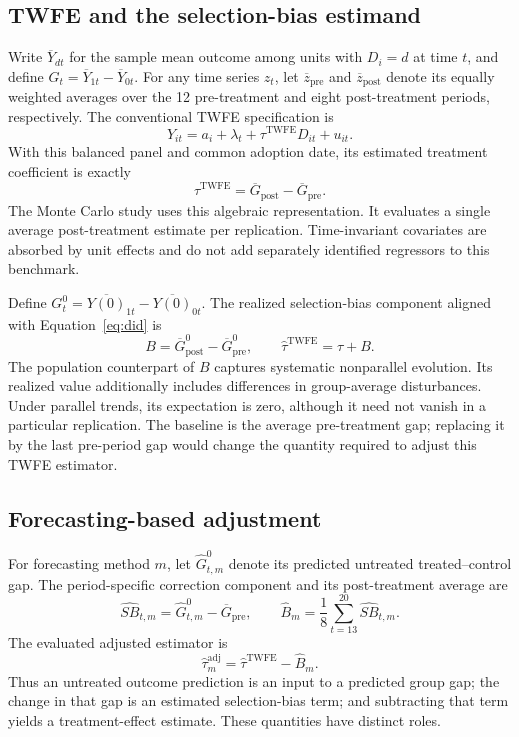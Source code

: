 \documentclass[11pt,a4paper]{article}
\begin{document}
\subsection{TWFE and the selection-bias estimand}
Write $\overline{Y}_{dt}$ for the sample mean outcome among units with $D_i=d$ at time $t$, and define $G_t=\overline{Y}_{1t}-\overline{Y}_{0t}$. For any time series $z_t$, let $\overline z_{\mathrm{pre}}$ and $\overline z_{\mathrm{post}}$ denote its equally weighted averages over the 12 pre-treatment and eight post-treatment periods, respectively. The conventional TWFE specification is
\begin{equation}\label{eq:twfe}
Y_{it}=a_i+\lambda_t+\tau^{\mathrm{TWFE}}D_{it}+u_{it}.
\end{equation}
With this balanced panel and common adoption date, its estimated treatment coefficient is exactly
\begin{equation}\label{eq:did}
\widehat\tau^{\mathrm{TWFE}}=\overline G_{\mathrm{post}}-\overline G_{\mathrm{pre}}.
\end{equation}
The Monte Carlo study uses this algebraic representation. It evaluates a single average post-treatment estimate per replication. Time-invariant covariates are absorbed by unit effects and do not add separately identified regressors to this benchmark.

Define $G_t^0=\overline{Y(0)}_{1t}-\overline{Y(0)}_{0t}$. The realized selection-bias component aligned with Equation~\ref{eq:did} is
\begin{equation}\label{eq:truebias}
B=\overline G^0_{\mathrm{post}}-\overline G^0_{\mathrm{pre}},
\qquad \widehat\tau^{\mathrm{TWFE}}=\tau+B.
\end{equation}
The population counterpart of $B$ captures systematic nonparallel evolution. Its realized value additionally includes differences in group-average disturbances. Under parallel trends, its expectation is zero, although it need not vanish in a particular replication. The baseline is the average pre-treatment gap; replacing it by the last pre-period gap would change the quantity required to adjust this TWFE estimator.

\subsection{Forecasting-based adjustment}
For forecasting method $m$, let $\widehat G^0_{t,m}$ denote its predicted untreated treated--control gap. The period-specific correction component and its post-treatment average are
\begin{equation}\label{eq:forecastbias}
\widehat{SB}_{t,m}=\widehat G^0_{t,m}-\overline G_{\mathrm{pre}},
\qquad \widehat B_m=\frac{1}{8}\sum_{t=13}^{20}\widehat{SB}_{t,m}.
\end{equation}
The evaluated adjusted estimator is
\begin{equation}\label{eq:adjusted}
\widehat\tau_m^{\mathrm{adj}}=\widehat\tau^{\mathrm{TWFE}}-\widehat B_m.
\end{equation}
Thus an untreated outcome prediction is an input to a predicted group gap; the change in that gap is an estimated selection-bias term; and subtracting that term yields a treatment-effect estimate. These quantities have distinct roles.
\end{document}
